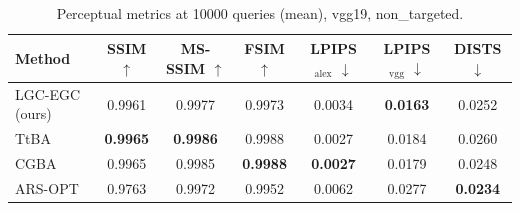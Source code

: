 \begin{table}[t]
\centering\footnotesize
\caption{Perceptual metrics at 10000 queries (mean), vgg19, non\_targeted.}
\begin{tabular}{lcccccc}
\toprule
Method & SSIM $\uparrow$ & MS-SSIM $\uparrow$ & FSIM $\uparrow$ & LPIPS$_{\mathrm{alex}}$ $\downarrow$ & LPIPS$_{\mathrm{vgg}}$ $\downarrow$ & DISTS $\downarrow$ \\
\midrule
LGC-EGC (ours) & 0.9961 & 0.9977 & 0.9973 & 0.0034 & \textbf{0.0163} & 0.0252 \\
TtBA & \textbf{0.9965} & \textbf{0.9986} & 0.9988 & 0.0027 & 0.0184 & 0.0260 \\
CGBA & 0.9965 & 0.9985 & \textbf{0.9988} & \textbf{0.0027} & 0.0179 & 0.0248 \\
ARS-OPT & 0.9763 & 0.9972 & 0.9952 & 0.0062 & 0.0277 & \textbf{0.0234} \\
\bottomrule
\end{tabular}
\end{table}
